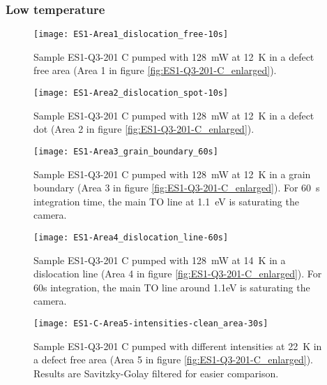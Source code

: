 \subsubsection{Low temperature}

\begin{figure}[H]
\centering
\texttt{[image: ES1-Area1\_dislocation\_free-10s]}
\caption[ES1-Q3-201 at a defect free area]{Sample ES1-Q3-201 C pumped with 128~mW at 12~K in a defect free area (Area 1 in figure \ref{fig:ES1-Q3-201-C_enlarged}).}
\label{fig:ES1-Area1_dislocation_free-10s}%
\end{figure}

\begin{figure}[H]
\centering
\texttt{[image: ES1-Area2\_dislocation\_spot-10s]}
\caption[ES1-Q3-201 at a defect free area]{Sample ES1-Q3-201 C pumped with 128~mW at 12~K in a defect dot (Area 2 in figure \ref{fig:ES1-Q3-201-C_enlarged}).}
\label{fig:ES1-Area2_dislocation_spot-10s}%
\end{figure}


\begin{figure}[H]
\centering
\texttt{[image: ES1-Area3\_grain\_boundary\_60s]}
\caption[ES1-Q3-201 at a grain boundary]{Sample ES1-Q3-201 C pumped with 128~mW at 12~K in a grain boundary (Area 3 in figure \ref{fig:ES1-Q3-201-C_enlarged}). For 60~s integration time, the main TO line at 1.1~eV is saturating the camera.}
\label{fig:ES1-Area3_grain_boundary_60s}%
\end{figure}

\begin{figure}[H]
\centering
\texttt{[image: ES1-Area4\_dislocation\_line-60s]}
\caption[ES1-Q3-201 at a dislocation line]{Sample ES1-Q3-201 C pumped with 128~mW at 14~K in a dislocation line (Area 4 in figure \ref{fig:ES1-Q3-201-C_enlarged}). For 60s integration, the main TO line around 1.1eV is saturating the camera.}
\label{fig:ES1-Area4_dislocation_line-60s}%
\end{figure}



\begin{figure}[H]
\centering
\texttt{[image: ES1-C-Area5-intensities-clean\_area-30s]}
\caption[ES1-Q3-201 at a defect free area]{Sample ES1-Q3-201 C pumped with different intensities at 22~K in a defect free area (Area 5 in figure \ref{fig:ES1-Q3-201-C_enlarged}). Results are Savitzky-Golay filtered for easier comparison.}
\label{fig:ES1-C-Area5-intensities-clean_area-30s}%
\end{figure}

